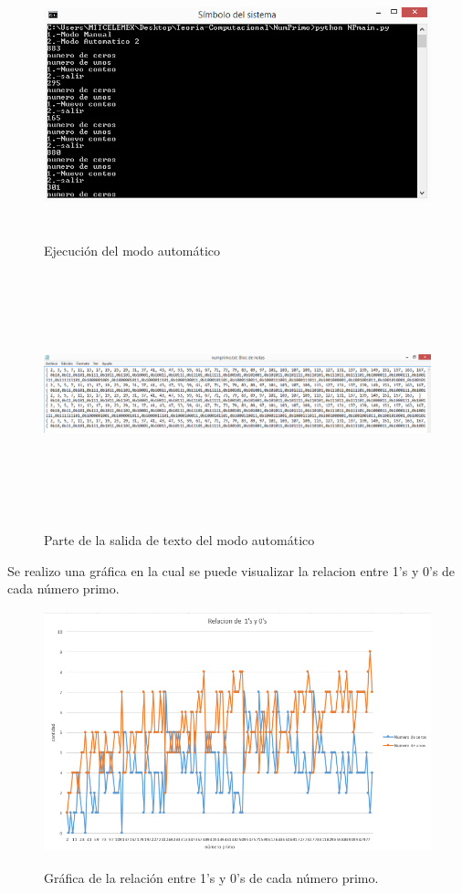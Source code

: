 \documentclass[12pt,letterpaper]{article}
\begin{document}
\begin{figure}[H]
\includegraphics[width=\textwidth, height=7cm]{automaticoprimo.png}
\label{fig:automatico_primo}
\caption{Ejecuci\'on del modo autom\'atico}
\end{figure}

\begin{figure}[H]
\includegraphics[width=\textwidth, height=7cm]{textoautomaticoprimo.png}
\label{fig:automaticotexto_primo}
\caption{Parte de la salida de texto del modo autom\'atico}
\end{figure}

Se realizo una gr\'afica en la cual se puede visualizar la relacion entre 1's y 0's de cada n\'umero primo.

\begin{figure}[H]
\includegraphics[width=\textwidth, height=7cm]{graficaprimo.png}
\label{fig:grafica_primo}
\caption{Gr\'afica de la relaci\'on entre 1's y 0's de cada n\'umero primo.}
\end{figure}
\newpage
\end{document}
